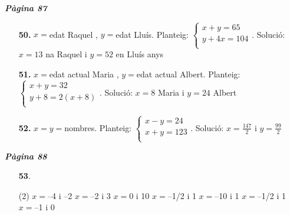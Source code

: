 \documentclass[a4paper, pdf, twoside]{book}
\begin{document}
\begin{multicols}{2}

{\textbf{\em Pàgina 87}} \hrulefill
\begin{enumerate}
\vspace{0.25cm}
\item[\fontfamily{phv}\selectfont\color{blue}\textbf{50. }] 
$x=$edat Raquel , $y=$edat Lluís. Planteig: $\left \{\begin {array}{l} x+y=65 \\ y+4x=104 \\ \end {array} \right .$. Solució: $x=13$ na Raquel i $y=52$ en Lluís anys
 \end{enumerate}
\begin{enumerate}
\vspace{0.25cm}
\item[\fontfamily{phv}\selectfont\color{blue}\textbf{51. }] 
$x=$edat actual Maria , $y=$edat actual Albert. Planteig: $\left \{\begin {array}{l} x+y=32 \\ y+8= 2(x+8) \\ \end {array} \right .$. Solució: $x=8$ Maria i $y=24$ Albert
\vspace{0.25cm}
\item[\fontfamily{phv}\selectfont\color{blue}\textbf{52. }] 
$x=y=$nombres. Planteig: $\left \{\begin {array}{l} x-y= 24\\ x+y=123 \\ \end {array} \right .$. Solució: $x=\frac {147}{2}$ i $y=\frac {99}{2}$
 \end{enumerate}
\vspace{0.3cm}


{\textbf{\em Pàgina 88}} \hrulefill
\begin{enumerate}
\vspace{0.25cm}



 \item[\fontfamily{phv}\selectfont\color{blue}\textbf{53}. ] 
 \begin{tasks}[column-sep=1em, item-indent=1.3333em](2)
	 \task $x=$--4 i --2
	 \task $x=$--2 i 3
	 \task $x=0$ i 10
	 \task $x=$--1/2 i 1
	 \task $x=$--10 i 1
	 \task $x=$--1/2 i 1
	 \task $x=$--1 i 0
\end{tasks}
 \end{enumerate}
\begin{enumerate}
\vspace{0.25cm}



\end{enumerate}
\end{multicols}
\end{document}
